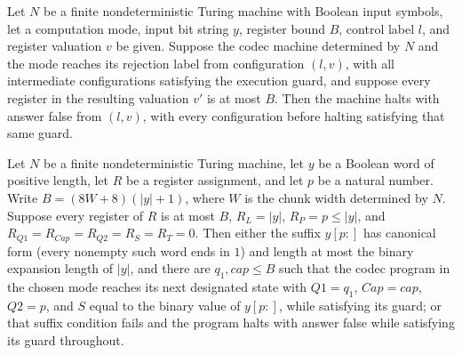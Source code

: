 \begin{lemma}
\label{Complexity.Codec.halt_rej}
\leanok
{}
Let $N$ be a finite nondeterministic Turing machine with Boolean input symbols, let a
computation mode, input bit string $y$, register bound $B$, control label $l$, and
register valuation $v$ be given. Suppose the codec machine determined by $N$ and the
mode reaches its rejection label from configuration $(l,v)$, with all intermediate
configurations satisfying the execution guard, and suppose every register in the
resulting valuation $v'$ is at most $B$. Then the machine halts with answer false from
$(l,v)$, with every configuration before halting satisfying that same guard.
\end{lemma}

\begin{theorem}
\label{Complexity.Codec.sw_run}
\leanok
{}
Let $N$ be a finite nondeterministic Turing machine, let $y$ be a Boolean word of
positive length, let $R$ be a register assignment, and let $p$ be a natural number.
Write $B=(8W+8)(|y|+1)$, where $W$ is the chunk width determined by $N$. Suppose every
register of $R$ is at most $B$, $R_L=|y|$, $R_P=p\le |y|$, and
$R_{Q1}=R_{Cap}=R_{Q2}=R_S=R_T=0$. Then either the suffix $y[p:]$ has canonical form
(every nonempty such word ends in $1$) and length at most the binary expansion length of
$|y|$, and there are $q_1,cap\le B$ such that the codec program in the chosen mode
reaches its next designated state with $Q1=q_1$, $Cap=cap$, $Q2=p$, and $S$ equal to the
binary value of $y[p:]$, while satisfying its guard; or that suffix condition fails and
the program halts with answer false while satisfying its guard throughout.
\end{theorem}

